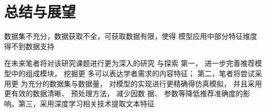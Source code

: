 ﻿\chapter{总结与展望}
\label{chap:conclusion}






数据集不充分，数据获取不全，可获取数据有限，使得
模型应用中部分特征维度得不到数据支持

在未来笔者将对该研究课题进行更为深入的研究
与探索
第一， 进一步完善推荐模型中的组成模块， 挖掘更
多可以表达学者需求的内容特征； 第二，笔者将尝试采用更
为充分的数据集与数据量， 对模型的实现进行更精确得仿真模拟， 并且采用更有效的数据清晰、 预处理方法， 减少因数
据、 参数等降低推荐准确度的影响。第三，采用深度学习相关技术提取文本特征